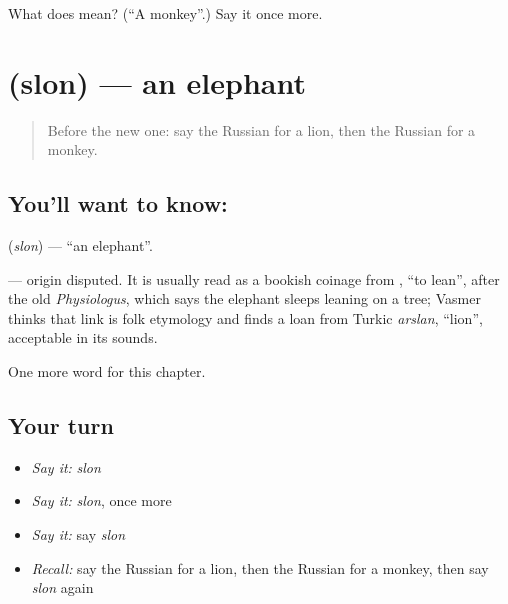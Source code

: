 \begin{tcolorbox}[breakable,colback=teal!4,colframe=teal!35!black,title={Before you move on}]
What does  mean? (\textquotedblleft{}A monkey\textquotedblright{}.) Say it once more.
\end{tcolorbox}
\section[\texorpdfstring{\ru{слон} (slon)}{слон (slon)}]{ (slon) — an elephant}

\label{lesson:RU-C120-elephant}



\begin{quote}
Before the new one: say the Russian for a lion, then the Russian for a monkey.
\end{quote}

\subsection*{You'll want to know: }
\textbf{} (\emph{slon}) — \textquotedblleft{}an elephant\textquotedblright{}.

\begin{cousinweb}
\textbf{} — origin disputed. It is usually read as a bookish coinage from \emph{}, \textquotedblleft{}to lean\textquotedblright{}, after the old \emph{Physiologus}, which says the elephant sleeps leaning on a tree; Vasmer thinks that link is folk etymology and finds a loan from Turkic \emph{arslan}, \textquotedblleft{}lion\textquotedblright{}, acceptable in its sounds.
\end{cousinweb}

\begin{grammarlens}[title={What you've built}]
One more word for this chapter.
\end{grammarlens}

\subsection*{Your turn}
\begin{itemize}
\raggedright
  \item \emph{Say it:} \emph{slon}
  \item \emph{Say it:} \emph{slon}, once more
  \item \emph{Say it:} say \emph{slon}
  \item \emph{Recall:} say the Russian for a lion, then the Russian for a monkey, then say \emph{slon} again
\end{itemize}

